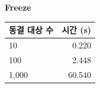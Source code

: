 \par\medskip\noindent
\begin{center}
{\small\setlength{\tabcolsep}{7pt}\renewcommand{\arraystretch}{1.12}
\textbf{Freeze}\par\smallskip
\begin{tabular}{@{}lr@{}}\toprule
\textbf{동결 대상 수} & \textbf{시간 (s)} \\
\midrule
10 & 0.220 \\
100 & 2.448 \\
1,000 & 60.540 \\
\bottomrule\end{tabular}}
\end{center}
\par\medskip
